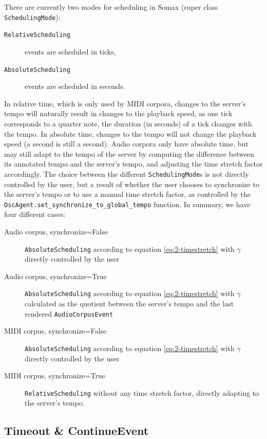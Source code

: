 There are currently two modes for scheduling in Somax (super class \texttt{SchedulingMode}): 
\begin{description}
	\item[\texttt{RelativeScheduling}] events are scheduled in ticks,
	\item[\texttt{AbsoluteScheduling}] events are scheduled in seconds. 
\end{description}
In relative time, which is only used by MIDI corpora, changes to the server's tempo will naturally result in changes to the playback speed, as one tick corresponds to a quarter note, the duration (in seconds) of a tick changes with the tempo. In absolute time, changes to the tempo will not change the playback speed (a second is still a second). Audio corpora only have absolute time, but may still adapt to the tempo of the server by computing the difference between its annotated tempo and the server's tempo, and adjusting the time stretch factor accordingly. The choice between the different \texttt{SchedulingMode}s is not directly controlled by the user, but a result of whether the user chooses to synchronize to the server's tempo or to use a manual time stretch factor, as controlled by the \texttt{OscAgent.set\_synchronize\_to\_global\_tempo} function. In summary, we have four different cases:

\begin{description}
	\item[Audio corpus, synchronize=False] \texttt{AbsoluteScheduling} according to equation \ref{eq:2-timestretch} with $\gamma$ directly controlled by the user
	\item[Audio corpus, synchronize=True] \texttt{AbsoluteScheduling} according to equation \ref{eq:2-timestretch} with $\gamma$ calculated as the quotient between the server's tempo and the last rendered \texttt{AudioCorpusEvent}
	\item[MIDI corpus, synchronize=False] \texttt{AbsoluteScheduling} according to equation \ref{eq:2-timestretch} with $\gamma$ directly controlled by the user
	\item[MIDI corpus, synchronize=True] \texttt{RelativeScheduling} without any time stretch factor, directly adapting to the server's tempo.
\end{description}



\subsection{Timeout \& ContinueEvent}\label{ssec:2-timeout}

